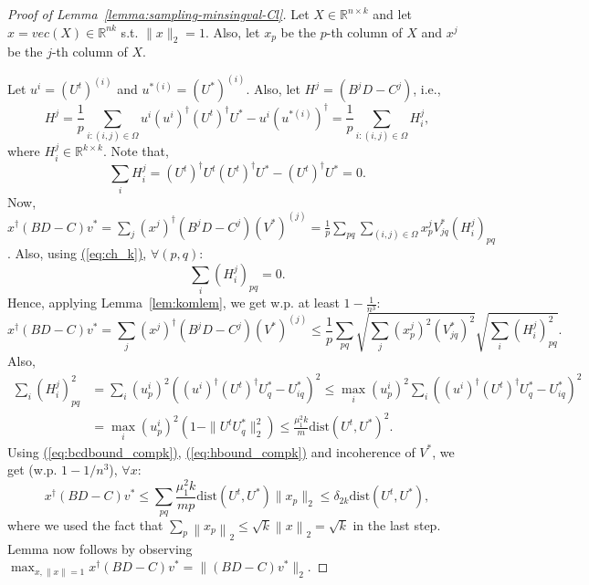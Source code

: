 \documentclass[11pt]{article}
\renewcommand{\eqref}[1]{\hyperref[#1]{(\ref*{#1})}}
\theoremstyle{plain}
\theoremstyle{definition}
\newcommand{\dist}{\mathrm{dist}}
\newcommand{\twonorm}[1]{\left\| {#1} \right\|_2}
\newcommand{\Vt}{V^{t+1}}
\newcommand{\Ut}{U^{t}}
\newcommand{\Vo}{V^*}
\newcommand{\Uo}{U^*}
\begin{document}
\begin{proof}[Proof of Lemma~\ref{lemma:sampling-minsingval-Cl}]
Let $X\in \mathbb{R}^{n\times k}$ and let $x=vec(X)\in \mathbb{R}^{nk}$ s.t. $\|x\|_2=1$. Also, let $x_p$ be the $p$-th column of $X$ and $x^j$ be the $j$-th column of $X$. 

Let $u^i=(\Ut)^{(i)}$ and $u^{*(i)}=(\Uo)^{(i)}$. Also, let $H^j=(B^jD-C^j)$, i.e., 
$$H^j=\frac{1}{p}\sum_{i:(i,j)\in \Omega}u^i(u^i)^\dag (\Ut)^\dag \Uo - u^i (u^{*(i)})^\dag =\frac{1}{p}\sum_{i:(i,j)\in \Omega} H^j_i,$$ where $H^j_i\in \mathbb{R}^{k\times k}$. Note that, 
\begin{equation}\label{eq:ch_k}\sum_{i}H^j_i=(\Ut)^\dag \Ut (\Ut)^\dag\Uo - (\Ut)^\dag \Uo = 0.\end{equation}
Now, $x^\dag(BD-C)v^*= \sum_j(x^j)^\dag(B^jD-C^j)(\Vo)^{(j)}=\frac{1}{p}\sum_{pq}\sum_{(i,j)\in \Omega}x^j_p\Vo_{jq}(H^j_i)_{pq}$. Also, using \eqref{eq:ch_k}, $\forall (p,q)$: $$\sum_{i}(H^j_i)_{pq}=0.$$
Hence, applying Lemma~\ref{lem:komlem}, we get w.p. at least $1-\frac{1}{n^3}$:
\begin{equation}\label{eq:bcdbound_compk}x^\dag (BD-C)v^*=\sum_j(x^j)^\dag(B^jD-C^j)(\Vo)^{(j)}\leq \frac{1}{p}\sum_{pq}\sqrt{\sum_j(x^j_p)^2(\Vo_{jq})^2}\sqrt{\sum_i(H^j_i)_{pq}^2}.\end{equation}
Also, 
\begin{align}
\sum_i(H^j_i)_{pq}^2&=\sum_i(u^i_p)^2((u^i)^\dag (\Ut)^\dag\Uo_q-\Uo_{iq})^2\leq \max_i(u^i_p)^2\sum_i((u^i)^\dag (\Ut)^\dag\Uo_q-\Uo_{iq})^2\nonumber\\&=\max_i(u^i_p)^2 (1-\|\Ut\Uo_q\|_2^2) \leq \frac{\mu_1^2k}{m}\dist(\Ut, \Uo)^2.\label{eq:hbound_compk}\end{align}
Using \eqref{eq:bcdbound_compk}, \eqref{eq:hbound_compk} and incoherence of $\Vo$, we get (w.p. $1-1/n^3$), $\forall x$: 
$$x^\dag(BD-C)v^*\leq \sum_{pq}\frac{\mu_1^2k}{mp}\dist(\Ut, \Uo)\|x_p\|_2\leq \delta_{2k}\dist(\Ut, \Uo),$$
where we used the fact that $\sum_p \twonorm{x_p} \leq \sqrt{k}\twonorm{x} = \sqrt{k}$ in the last step.
Lemma now follows by observing $\max_{x, \|x\|=1} x^\dag(BD-C)v^*=\|(BD-C)v^*\|_2$. 
\end{proof}




\end{document}
